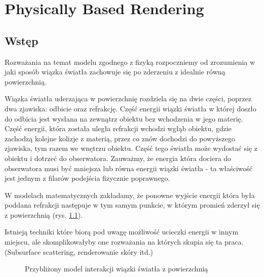 \documentclass[../main.tex]{subfiles}
\begin{document}
\chapter{Physically Based Rendering}

\section{Wstęp}

Rozważania na temat modelu zgodnego z fizyką rozpoczniemy od zrozumienia w jaki
sposób wiązka światła zachowuje się po zderzeniu z idealnie równą powierzchnią.

Wiązka światła uderzająca w powierzchnię rozdziela się na dwie części, poprzez
dwa zjawiska: odbicie oraz refrakcję. Część energii wiązki światła w której
doszło do odbicia jest wysłana na zewnątrz obiektu bez wchodzenia w jego
materię. Część energii, która została uległa refrakcji wchodzi wgłąb obiektu,
gdzie zachodzą kolejne kolizje z materią, przez co znów dochodzi do powyższego
zjawiska, tym razem we wnętrzu obiektu. Część tego światła może wydostać się
z obiektu i dotrzeć do obserwatora. Zauważmy, że energia która dociera do
obserwatora musi być mniejsza lub równa energii wiązki światła - ta właściwość
jest jednym z filarów podejścia fizycznie poprawnego.

W modelach matematycznych zakładamy, że ponowne wyjście energii która była
poddana refrakcji następuje w tym samym punkcie, w którym promień zderzył się z
powierzchnią (rys. \ref{fig:ReflectionRefraction}).

Istnieją techniki które biorą pod uwagę możliwość ucieczki energii w innym
miejscu, ale skomplikowałyby one rozważania na których skupia się ta praca.
(Subsurface scattering, renderowanie skóry itd.)

\begin{figure}[h]
  \centering
  \caption{Przybliżony model interakcji wiązki światła z powierzchnią}
  \label{fig:ReflectionRefraction}
\end{figure}
\end{document}
